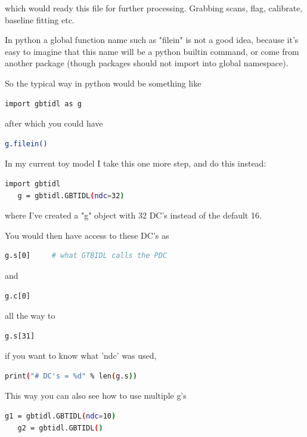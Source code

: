 \documentclass[12pt,a4paper]{article}
\begin{document}
which would ready this file for further processing. Grabbing scans,
flag, calibrate, baseline fitting etc.


In python a global function name such as "filein" is not a good idea,
because it's easy to imagine that this name will be a python builtin
command, or come from another package (though packages should not
import into global namespace).

So the typical way in python would be something like

\begin{lstlisting}[language=bash]
   import gbtidl as g
\end{lstlisting}

after which you could have

\begin{lstlisting}[language=bash]
   g.filein()
\end{lstlisting}

In my current toy model I take this one more step, and do this instead:

\begin{lstlisting}[language=bash]
   import gbtidl
   g = gbtidl.GBTIDL(ndc=32)
\end{lstlisting}

where I've created a "g" object with 32 DC's instead of the default 16.

You would then have access to these DC's as
\begin{lstlisting}[language=bash]
   g.s[0]     # what GTBIDL calls the PDC
\end{lstlisting}
and
\begin{lstlisting}[language=bash]
   g.c[0]
\end{lstlisting}
   
all the way to

\begin{lstlisting}[language=bash]
   g.s[31]
\end{lstlisting}

if you want to know what 'ndc' was used,

\begin{lstlisting}[language=bash]
   print("# DC's = %d" % len(g.s))
\end{lstlisting}

This way you can also see how to use multiple g's

\begin{lstlisting}[language=bash]
   g1 = gbtidl.GBTIDL(ndc=10)
   g2 = gbtidl.GBTIDL()
\end{lstlisting}
\end{document}
